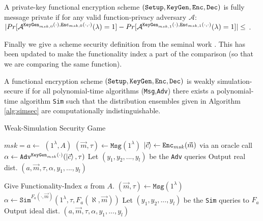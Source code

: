 \begin{definition}
\label{def:ffp}
A private-key functional encryption scheme $(\texttt{Setup},\texttt{KeyGen},\texttt{Enc},\texttt{Dec})$ is fully message private if for any valid function-privacy adversary $\mathcal{A}$: \\
$ \lvert Pr[  \mathcal{A}^{\texttt{KeyGen}_{msk,0}(\cdot),\texttt{Enc}_{msk,0}(\cdot,\cdot)}(\lambda) = 1] - Pr[ \mathcal{A}^{\texttt{KeyGen}_{msk,1}(\cdot),\texttt{Enc}_{msk,1}(\cdot,\cdot)}(\lambda) = 1] \rvert \\ \le $ \negl.
\end{definition}

\noindent Finally we give a scheme security definition from the seminal work \cite{fe}. This has been updated to make the functionality index a part of the comparison (so that we are comparing the same function).

\begin{definition}
\label{def:wss}
A functional encryption scheme $(\texttt{Setup},\texttt{KeyGen},\texttt{Enc},\texttt{Dec})$ is weakly simulation-secure if for all polynomial-time algorithms (\texttt{Msg},\texttt{Adv}) there exists a polynomial-time algorithm \texttt{Sim} such that the distribution ensembles given in Algorithm \ref{alg:simsec} are computationally indistinguishable.
\end{definition}

\begin{algorithm}[h]
\caption{Weak-Simulation Security Game}
\label{alg:simsec}
  \begin{multicols}{2}
    \begin{algorithmic}[Real]
      \State $msk = a \leftarrow$ \setup$(1^\lambda,A)$
      \State $(\vec m, \tau) \leftarrow \texttt{Msg}(1^\lambda)$
      \State $\ket{\vec c} \leftarrow \texttt{Enc}_{msk}(\vec m)$ via an oracle call
      \State $\alpha \leftarrow \texttt{Adv}^{\texttt{KeyGen}_{msk}(\cdot)}(\ket{\vec c}, \tau)$
      \State Let $(y_1,y_2,...,y_l)$ be the \texttt{Adv} queries
      \State Output real dist. $(a,\vec m, \tau, \alpha, y_1, ..., y_l)$
    \end{algorithmic}
    \columnbreak
    \begin{algorithmic}[Ideal]
     \State Give Functionality-Index $a$ from $A$.
     \State $(\vec m, \tau) \leftarrow \texttt{Msg}(1^\lambda)$
     \State $\alpha \leftarrow \texttt{Sim}^{F_a(\cdot, \vec m)}(1^\lambda, \tau, F_a(\aleph,\vec m))$
     \State Let $(y_1,y_2,...,y_l)$ be the \texttt{Sim} queries to $F_a$
     \State Output ideal dist. $(a,\vec m, \tau, \alpha, y_1, ..., y_l)$
    \end{algorithmic}
  \end{multicols}
\end{algorithm}